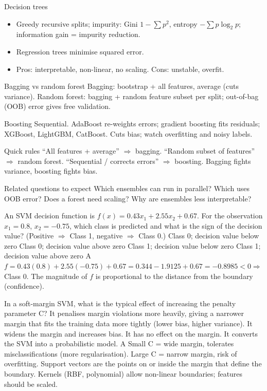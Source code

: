 {\begin{block}{Decision trees}
		\begin{itemize}
			\item Greedy recursive splits; impurity: Gini $1-\sum p^2$, entropy $-\sum p\log_2p$; information gain = impurity reduction.
			\item Regression trees minimise squared error.
			\item Pros: interpretable, non-linear, no scaling. Cons: unstable, overfit.
	\end{itemize}\end{block}
	\begin{block}{Bagging vs random forest}
		Bagging: bootstrap + all features, average (cuts variance). Random forest: bagging + random feature subset per split; out-of-bag (OOB) error gives free validation.
\end{block}}
{\begin{block}{Boosting}
		Sequential. AdaBoost re-weights errors; gradient boosting fits residuals; XGBoost, LightGBM, CatBoost. Cuts bias; watch overfitting and noisy labels.
	\end{block}
	\begin{block}{Quick rules}
		``All features + average'' $\Rightarrow$ bagging. ``Random subset of features'' $\Rightarrow$ random forest. ``Sequential / corrects errors'' $\Rightarrow$ boosting. Bagging fights variance, boosting fights bias.
	\end{block}
	\begin{alertblock}{Related questions to expect}
		Which ensembles can run in parallel? Which uses OOB error? Does a forest need scaling? Why are ensembles less interpretable?
\end{alertblock}}

{An SVM decision function is $f(x)=0.43x_1+2.55x_2+0.67$. For the observation $x_1=0.8$, $x_2=-0.75$, which class is predicted and what is the sign of the decision value? (Positive $\Rightarrow$ Class 1, negative $\Rightarrow$ Class 0.)}
{Class 0; decision value below zero}
{Class 0; decision value above zero}
{Class 1; decision value below zero}
{Class 1; decision value above zero}
{A}
{$f=0.43(0.8)+2.55(-0.75)+0.67=0.344-1.9125+0.67=-0.8985<0\Rightarrow$ Class 0. The magnitude of $f$ is proportional to the distance from the boundary (confidence).}

{In a soft-margin SVM, what is the typical effect of increasing the penalty parameter C?}
{It penalises margin violations more heavily, giving a narrower margin that fits the training data more tightly (lower bias, higher variance).}
{It widens the margin and increases bias.}
{It has no effect on the margin.}
{It converts the SVM into a probabilistic model.}
{A}
{Small C = wide margin, tolerates misclassifications (more regularisation). Large C = narrow margin, risk of overfitting. Support vectors are the points on or inside the margin that define the boundary. Kernels (RBF, polynomial) allow non-linear boundaries; features should be scaled.}

